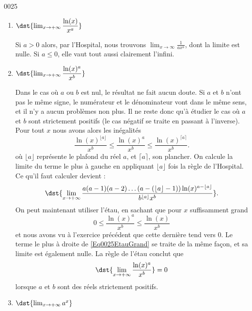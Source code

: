
\begin{corrige}{0025}



\begin{enumerate}
\item 
 $\dst{\lim_{x\rightarrow +\infty} \dfrac{\ln(x)}{x^a} } $

Si $a>0$ alors, par l'Hospital, nous trouvons $\lim_{x\to\infty}\frac{1}{ ax^a }$, dont la limite est nulle. Si $a\leq0$, elle vaut tout aussi clairement l'infini.

\item
  $\dst{\lim_{x\rightarrow +\infty} \dfrac{\ln(x)^a}{x^b} } $

Dans le cas où $a$ ou $b$ est nul, le résultat ne fait aucun doute. Si $a$ et $b$ n'ont pas le même signe, le numérateur et le dénominateur vont dans le même sens, et il n'y a aucun problèmes non plus. Il ne reste donc qu'à étudier le cas où $a$ et $b$ sont strictement positifs (le cas négatif se traite en passant à l'inverse). Pour tout $x$ nous avons alors les inégalités
\begin{equation}		\label{Eq0025EtauGrand}
	\frac{ \ln(x)^{\lfloor a\rfloor} }{ x^b }\leq\frac{ \ln(x)^{a} }{ x^b }\leq\frac{ \ln(x)^{\lceil a\rceil} }{ x^b }.
\end{equation}
où $\lfloor a \rfloor$ représente le plafond du réel $a$, et $\lceil a\rceil$, son plancher. On calcule la limite du terme le plus à gauche en appliquant $\lfloor a\rfloor$ fois la règle de l'Hospital. Ce qu'il faut calculer devient :
\[ 
\dst{\lim_{x\rightarrow +\infty} \dfrac{a(a-1)(a-2)\ldots(a-(\lfloor a \rfloor-1))\ln(x)^{a-\lfloor a \rfloor}}{b^{\lfloor a \rfloor}x^b} }.
\]
On peut maintenant utiliser l'étau, en sachant que pour $x$ suffisamment grand \[0 \leq \dfrac{\ln(x)^a}{x^b} \leq \dfrac{\ln(x)}{x^b}\] et nous avons vu à l'exercice précédent que cette dernière tend vers $0$. Le terme le plus à droite de \eqref{Eq0025EtauGrand} se traite de la même façon, et sa limite est également nulle. La règle de l'étau conclut que
\begin{equation}
	\dst{\lim_{x\rightarrow +\infty} \dfrac{\ln(x)^a}{x^b} } =0
\end{equation}
lorsque $a$ et $b$ sont des réels strictement positifs.

\item
 $\dst{\lim_{x\rightarrow +\infty} a^x} $


\end{enumerate}
\end{corrige}
